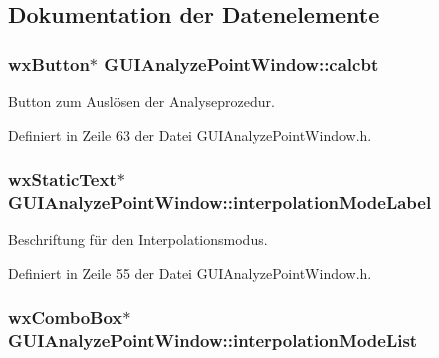 \subsection{Dokumentation der Datenelemente}
\hypertarget{classGUIAnalyzePointWindow_a2650076436d57254fa9dd0df3783593e}{
\subsubsection[{calcbt}]{\setlength{\rightskip}{0pt plus 5cm}wx\-Button$\ast$ G\-U\-I\-Analyze\-Point\-Window\-::calcbt\hspace{0.3cm}{\ttfamily [private]}}}\label{classGUIAnalyzePointWindow_a2650076436d57254fa9dd0df3783593e}


Button zum Auslösen der Analyseprozedur. 



Definiert in Zeile 63 der Datei G\-U\-I\-Analyze\-Point\-Window.\-h.

\hypertarget{classGUIAnalyzePointWindow_a6a1b5c74ab4aca0f3ccea3ef83043b35}{
\subsubsection[{interpolation\-Mode\-Label}]{\setlength{\rightskip}{0pt plus 5cm}wx\-Static\-Text$\ast$ G\-U\-I\-Analyze\-Point\-Window\-::interpolation\-Mode\-Label\hspace{0.3cm}{\ttfamily [private]}}}\label{classGUIAnalyzePointWindow_a6a1b5c74ab4aca0f3ccea3ef83043b35}


Beschriftung für den Interpolationsmodus. 



Definiert in Zeile 55 der Datei G\-U\-I\-Analyze\-Point\-Window.\-h.

\hypertarget{classGUIAnalyzePointWindow_a6b2da34e788e56e70789d2cfc9767357}{
\subsubsection[{interpolation\-Mode\-List}]{\setlength{\rightskip}{0pt plus 5cm}wx\-Combo\-Box$\ast$ G\-U\-I\-Analyze\-Point\-Window\-::interpolation\-Mode\-List\hspace{0.3cm}{\ttfamily [private]}}}\label{classGUIAnalyzePointWindow_a6b2da34e788e56e70789d2cfc9767357}



